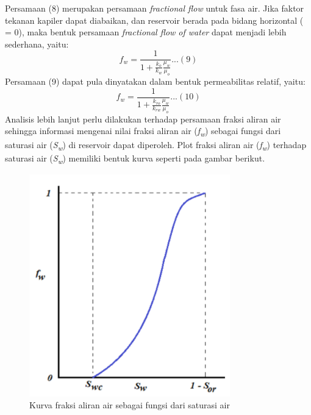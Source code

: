 \documentclass[
]{book}
\begin{document}
Persamaan (8) merupakan persamaan \emph{fractional flow} untuk fasa air. Jika faktor tekanan kapiler dapat diabaikan, dan reservoir berada pada bidang horizontal ( = 0), maka bentuk persamaan \emph{fractional flow of water} dapat menjadi lebih sederhana, yaitu:
\[f_w = \frac{1}{1+\frac{k_o}{k_w}\frac{\mu_w}{\mu_o}}...(9)\]
Persamaan (9) dapat pula dinyatakan dalam bentuk permeabilitas relatif, yaitu:
\[f_w = \frac{1}{1+\frac{k_{ro}}{k_{rw}}\frac{\mu_w}{\mu_o}}...(10)\]
Analisis lebih lanjut perlu dilakukan terhadap persamaan fraksi aliran air sehingga informasi mengenai nilai fraksi aliran air (\emph{f\textsubscript{w}}) sebagai fungsi dari saturasi air (\emph{S\textsubscript{w}}) di reservoir dapat diperoleh. Plot fraksi aliran air (\emph{f\textsubscript{w}}) terhadap saturasi air (\emph{S\textsubscript{w}}) memiliki bentuk kurva seperti pada gambar berikut.

\begin{figure}

{\centering \includegraphics[width=0.5\linewidth]{images/waterflood/fraksiair} 

}

\caption{Kurva fraksi aliran air sebagai fungsi dari saturasi air}\label{fig:unnamed-chunk-47}
\end{figure}

~
\end{document}
